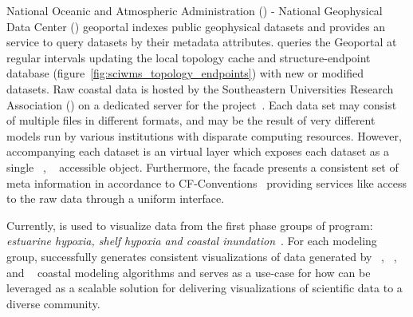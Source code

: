 National Oceanic and Atmospheric Administration (\noaa{}) - National
Geophysical Data Center (\ngdc{}) geoportal indexes public geophysical
datasets and provides an \ogc{} \csw{} service to query datasets by
their metadata attributes. \sciwms{} queries the \ngdc{} Geoportal at
regular intervals updating the local topology cache and
structure-endpoint database
(figure~\ref{fig:sciwms_topology_endpoints}) with new or modified
datasets. Raw coastal data is hosted by the Southeastern Universities
Research Association (\sura{}) on a dedicated server for the \comt{}
project~\cite{luettich12}. Each data set may consist of multiple files
in different formats, and may be the result of very different models
run by various institutions with disparate computing
resources. However, accompanying each dataset is an \ncml{} virtual
layer which exposes each dataset as a single \netcdf{}~\cite{netcdf},
\opendap{}~\cite{Cornillon03} accessible object. Furthermore, the
\ncml{} facade presents a consistent set of meta information in
accordance to CF-Conventions~\cite{cf} providing services like
\sciwms{} access to the raw data through a uniform interface.

Currently, \Sciwms{} is used to visualize data from the first phase
groups of \ioos{} \comt{} program: {\em estuarine hypoxia, shelf
  hypoxia and coastal inundation}~\cite{luettich13}. For each modeling
group, \sciwms{} successfully generates consistent visualizations of
data generated by \adcirc{}~\cite{adcirc}, \fvcom{}~\cite{chen06},
\selfe{}~\cite{zhang08} and \slosh{}~\cite{chen84} coastal modeling
algorithms and serves as a use-case for how \sciwms{} can be leveraged
as a scalable solution for delivering visualizations of
scientific data to a diverse community.

